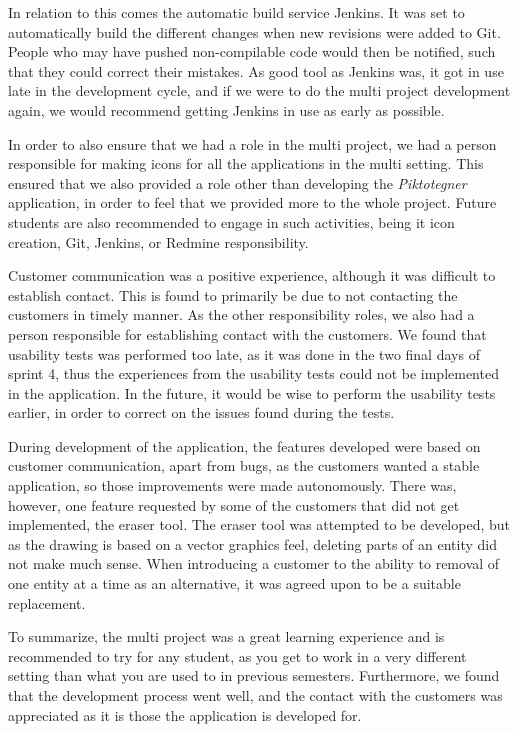 In relation to this comes the automatic build service Jenkins. 
It was set to automatically build the different changes when new revisions were added to Git. 
People who may have pushed non-compilable code would then be notified, such that they could correct their mistakes.
As good tool as Jenkins was, it got in use late in the development cycle, and if we were to do the multi project development again, we would recommend getting Jenkins in use as early as possible.

In order to also ensure that we had a role in the multi project, we had a person responsible for making icons for all the applications in the multi setting.
This ensured that we also provided a role other than developing the \textit{Piktotegner} application, in order to feel that we provided more to the whole project. 
Future students are also recommended to engage in such activities, being it icon creation, Git, Jenkins, or Redmine responsibility.

Customer communication was a positive experience, although it was difficult to establish contact.
This is found to primarily be due to not contacting the customers in timely manner.
As the other responsibility roles, we also had a person responsible for establishing contact with the customers.
We found that usability tests was performed too late, as it was done in the two final days of sprint 4, thus the experiences from the usability tests could not be implemented in the application.
In the future, it would be wise to perform the usability tests earlier, in order to correct on the issues found during the tests.

During development of the application, the features developed were based on customer communication, apart from bugs, as the customers wanted a stable application, so those improvements were made autonomously.
There was, however, one feature requested by some of the customers that did not get implemented, the eraser tool.
The eraser tool was attempted to be developed, but as the drawing is based on a vector graphics feel, deleting parts of an entity did not make much sense. 
When introducing a customer to the ability to removal of one entity at a time as an alternative, it was agreed upon to be a suitable replacement.

To summarize, the multi project was a great learning experience and is recommended to try for any student, as you get to work in a very different setting than what you are used to in previous semesters. 
Furthermore, we found that the development process went well, and the contact with the customers was appreciated as it is those the application is developed for.


% 

